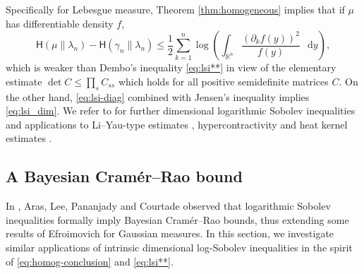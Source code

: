 \documentclass[a4paper,twoside,11pt,reqno]{amsart}
\newcommand*\diff{\mathop{}\!\mathrm{d}}
\newcommand{\R}{\mathbb{R}} %
\newcommand{\HH}{\mathsf{H}}
\begin{document}
Specifically for Lebesgue measure, Theorem \ref{thm:homogeneous} implies that if $\mu$ has differentiable density $f$, 
\begin{equation} \label{eq:lsi-diag}
\HH(\mu\|\lambda_n)-\HH(\gamma_n\|\lambda_n) \leq \frac{1}{2} \sum_{k=1}^n \log\left(  \int_{\R^n} \frac{(\partial_k f(y))^2}{f(y)} \,\diff y \right),
\end{equation}
which is weaker than Dembo's inequality \eqref{eq:lsi**} in view of the elementary estimate $\det C\leq \prod_s C_{ss}$ which holds for all positive semidefinite matrices $C$. On the other hand, \eqref{eq:lsi-diag} combined with Jensen's inequality implies \eqref{eq:lsi_dim}. We refer to \cite{BCL95,BL06,BBL12,BBL17} for further dimensional logarithmic Sobolev inequalities and applications to Li--Yau-type estimates \cite{LY86}, hypercontractivity \cite{Nel66, Bon70, Nel73, Bec75, Bak94} and heat kernel estimates \cite{Bak94,BCL95}.
 

\subsection{A Bayesian Cram\'er--Rao bound} 
\label{subsec:CR_bound}
In \cite{ALPC19}, Aras, Lee, Pananjady and Courtade observed that logarithmic Sobolev inequalities formally imply Bayesian Cram\'er--Rao bounds, thus extending some results of Efroimovich \cite{Efr80} for Gaussian measures. In this section, we investigate similar applications of intrinsic dimensional log-Sobolev inequalities in the spirit of \eqref{eq:homog-conclusion} and \eqref{eq:lsi**}.
\end{document}
